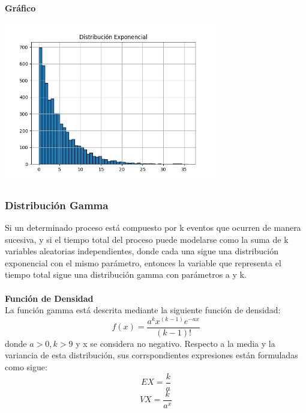 \documentclass[11pt]{article}
\begin{document}
\newpage
\noindent\textbf{Gráfico}

\begin{center}
\includegraphics[width=0.7\textwidth]{Images/histograma_exponencial.png}
\end{center}



\subsubsection{Distribución Gamma}
Si un determinado proceso está compuesto por k eventos que ocurren de manera sucesiva, y si el tiempo total del proceso puede modelarse como la suma de k variables aleatorias independientes, donde cada una sigue una distribución exponencial con el mismo parámetro, entonces la variable que representa el tiempo total sigue una distribución gamma con parámetros a y k. \\
\\
\noindent\textbf{Función de Densidad}\\
La función gamma está descrita mediante la siguiente función de densidad:
  \begin{equation}
    f(x) = \frac{a^{k}x^{(k-1)}e^{-ax}}{(k-1)!}
  \end{equation}
  donde $a > 0  ,  k > 9$ y x se considera no negativo.
  Respecto a la media y la variancia de esta distribución, sus corrspondientes expresiones están formuladas como sigue:
  \begin{equation}
    EX = \frac{k}{a}
  \end{equation}
  \begin{equation}
    VX = \frac{k}{a^{x}}
  \end{equation}
\end{document}
